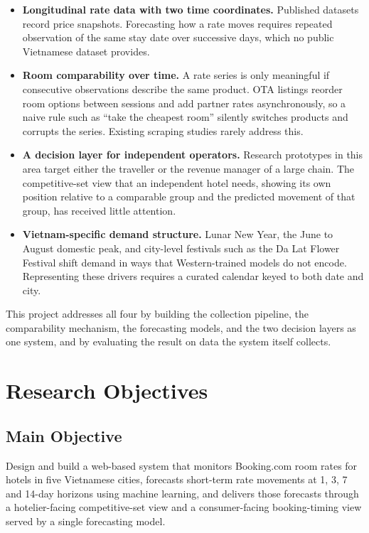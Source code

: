 \begin{itemize}[leftmargin=*]
    \item \textbf{Longitudinal rate data with two time coordinates.} Published datasets record price snapshots. Forecasting how a rate moves requires repeated observation of the same stay date over successive days, which no public Vietnamese dataset provides.
    \item \textbf{Room comparability over time.} A rate series is only meaningful if consecutive observations describe the same product. OTA listings reorder room options between sessions and add partner rates asynchronously, so a naive rule such as ``take the cheapest room'' silently switches products and corrupts the series. Existing scraping studies rarely address this.
    \item \textbf{A decision layer for independent operators.} Research prototypes in this area target either the traveller or the revenue manager of a large chain. The competitive-set view that an independent hotel needs, showing its own position relative to a comparable group and the predicted movement of that group, has received little attention.
    \item \textbf{Vietnam-specific demand structure.} Lunar New Year, the June to August domestic peak, and city-level festivals such as the Da Lat Flower Festival shift demand in ways that Western-trained models do not encode. Representing these drivers requires a curated calendar keyed to both date and city.
\end{itemize}

This project addresses all four by building the collection pipeline, the comparability mechanism, the forecasting models, and the two decision layers as one system, and by evaluating the result on data the system itself collects.

\section{Research Objectives}

\subsection{Main Objective}

Design and build a web-based system that monitors Booking.com room rates for hotels in five Vietnamese cities, forecasts short-term rate movements at 1, 3, 7 and 14-day horizons using machine learning, and delivers those forecasts through a hotelier-facing competitive-set view and a consumer-facing booking-timing view served by a single forecasting model.

